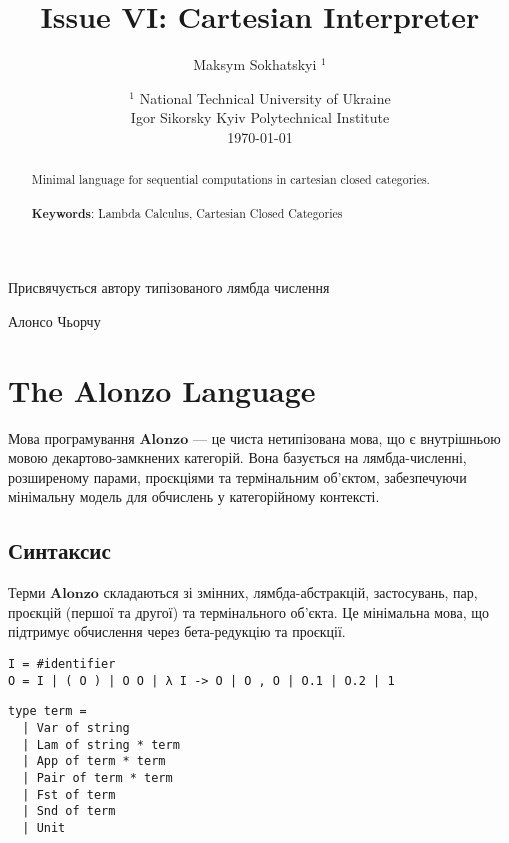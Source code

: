 \documentclass{article}
\begin{document}
\title{Issue VI: Cartesian Interpreter}
\author{Maksym Sokhatskyi $^1$}
\date{ $^1$ National Technical University of Ukraine \\
       \small Igor Sikorsky Kyiv Polytechnical Institute \\
       \today }

\maketitle

\begin{abstract}

Minimal language for sequential computations in cartesian closed categories.
\\
\\
{\bf Keywords}: Lambda Calculus, Cartesian Closed Categories
\end{abstract}

\ifincludeTOC
  \tableofcontents
\fi

\newpage

\epigraph{Присвячується автору типізованого лямбда числення}{Алонсо Чьорчу}

\section{The Alonzo Language}

Мова програмування $\mathbf{Alonzo}$ — це чиста нетипізована мова, що є внутрішньою мовою декартово-замкнених категорій. Вона базується на лямбда-численні, розширеному парами, проєкціями та термінальним об’єктом, забезпечуючи мінімальну модель для обчислень у категорійному контексті.

\subsection{Синтаксис}

Терми $\mathbf{Alonzo}$ складаються зі змінних, лямбда-абстракцій, застосувань, пар, проєкцій (першої та другої) та термінального об’єкта. Це мінімальна мова, що підтримує обчислення через бета-редукцію та проєкції.

\begin{lstlisting}[mathescape=true]
I = #identifier
O = I | ( O ) | O O | λ I -> O | O , O | O.1 | O.2 | 1
\end{lstlisting}

\begin{lstlisting}[mathescape=true]
type term =
  | Var of string
  | Lam of string * term
  | App of term * term
  | Pair of term * term
  | Fst of term
  | Snd of term
  | Unit
\end{lstlisting}
\end{document}
